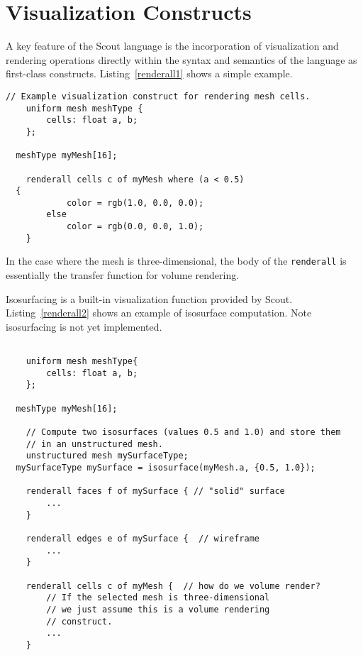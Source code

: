 \let\clearforchapter\par %


\chapter{Visualization Constructs}

A key feature of the Scout language is the incorporation of visualization and
rendering operations directly within the syntax and semantics of the language 
as first-class constructs.  Listing~\ref{renderall1} shows a simple example.

\par\bigskip
\begin{lstlisting}[float=h,label=renderall1,
	caption={A \texttt{renderall} loop construct.}]
	// Example visualization construct for rendering mesh cells. 
	uniform mesh meshType {
		cells: float a, b;
	};

  meshType myMesh[16];

	renderall cells c of myMesh where (a < 0.5)
  {
			color = rgb(1.0, 0.0, 0.0);
		else
			color = rgb(0.0, 0.0, 1.0);
	}
\end{lstlisting}
\par\bigskip\noindent

In the case where the mesh is three-dimensional, the body of the \texttt{renderall}
is essentially the transfer function for volume rendering.

Isosurfacing is a built-in visualization function provided by Scout.
Listing~\ref{renderall2} shows an example of isosurface computation.
Note isosurfacing is not yet implemented.

\par\bigskip
\begin{lstlisting}[float=h,label=renderall2,
	caption={A \texttt{renderall} loop for viewing an isosurface.}]
	
	uniform mesh meshType{
		cells: float a, b;
	};

  meshType myMesh[16];
	
    // Compute two isosurfaces (values 0.5 and 1.0) and store them 
    // in an unstructured mesh.
	unstructured mesh mySurfaceType;
  mySurfaceType mySurface = isosurface(myMesh.a, {0.5, 1.0});

	renderall faces f of mySurface { // "solid" surface
		...
	}
	
	renderall edges e of mySurface {  // wireframe
		...
	}
	
	renderall cells c of myMesh {  // how do we volume render?
		// If the selected mesh is three-dimensional 
		// we just assume this is a volume rendering
		// construct.
		...
	}
\end{lstlisting}
\par\bigskip\noindent


